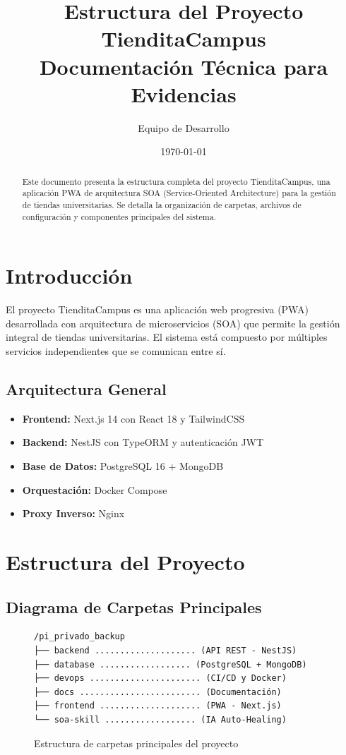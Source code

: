 \documentclass[12pt,a4paper]{article}
\title{\textbf{Estructura del Proyecto TienditaCampus} \\ \large{Documentaci\'on T\'ecnica para Evidencias}}
\author{Equipo de Desarrollo}
\date{\today}
\begin{document}
\maketitle

\begin{abstract}
Este documento presenta la estructura completa del proyecto TienditaCampus, una aplicaci\'on PWA de arquitectura SOA (Service-Oriented Architecture) para la gesti\'on de tiendas universitarias. Se detalla la organizaci\'on de carpetas, archivos de configuraci\'on y componentes principales del sistema.
\end{abstract}

\tableofcontents
\newpage

\section{Introducci\'on}

El proyecto TienditaCampus es una aplicaci\'on web progresiva (PWA) desarrollada con arquitectura de microservicios (SOA) que permite la gesti\'on integral de tiendas universitarias. El sistema est\'a compuesto por m\'ultiples servicios independientes que se comunican entre s\'i.

\subsection{Arquitectura General}
\begin{itemize}
\item \textbf{Frontend:} Next.js 14 con React 18 y TailwindCSS
\item \textbf{Backend:} NestJS con TypeORM y autenticaci\'on JWT
\item \textbf{Base de Datos:} PostgreSQL 16 + MongoDB
\item \textbf{Orquestaci\'on:} Docker Compose
\item \textbf{Proxy Inverso:} Nginx
\end{itemize}

\section{Estructura del Proyecto}

\subsection{Diagrama de Carpetas Principales}

\begin{figure}[h]
\centering
\begin{verbatim}
/pi_privado_backup
├── backend .................... (API REST - NestJS)
├── database .................. (PostgreSQL + MongoDB)
├── devops ...................... (CI/CD y Docker)
├── docs ........................ (Documentación)
├── frontend .................... (PWA - Next.js)
└── soa-skill .................. (IA Auto-Healing)
\end{verbatim}
\caption{Estructura de carpetas principales del proyecto}
\end{figure}
\end{document}
